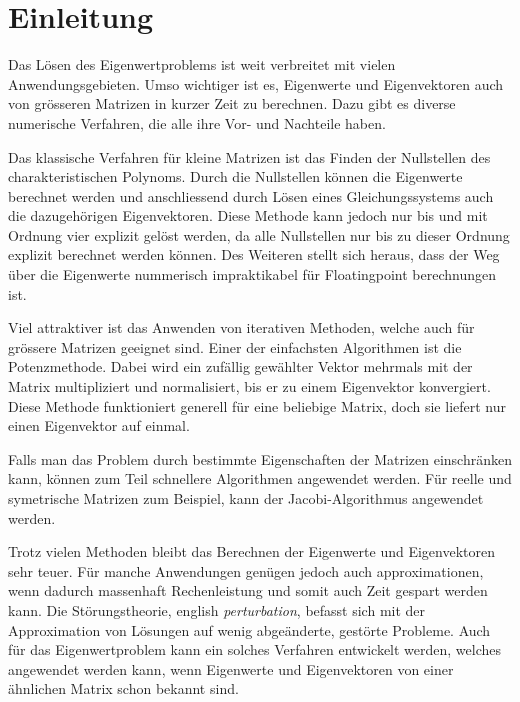 %
%
%
\section{Einleitung\label{ew:section:einleitung}}

Das Lösen des Eigenwertproblems ist  weit verbreitet mit vielen Anwendungsgebieten.
Umso wichtiger ist es, Eigenwerte und Eigenvektoren auch von grösseren Matrizen in kurzer Zeit zu berechnen.
Dazu gibt es diverse numerische Verfahren, die alle ihre Vor- und Nachteile haben.

Das klassische Verfahren für kleine Matrizen ist das Finden der Nullstellen des charakteristischen Polynoms.
Durch die Nullstellen können die Eigenwerte berechnet werden und anschliessend durch Lösen eines Gleichungssystems auch die dazugehörigen Eigenvektoren.
Diese Methode kann jedoch nur bis und mit Ordnung vier explizit gelöst werden, da alle Nullstellen nur bis zu dieser Ordnung explizit berechnet werden können.
Des Weiteren stellt sich heraus, dass der Weg über die Eigenwerte nummerisch impraktikabel für Floatingpoint berechnungen ist. 

Viel attraktiver ist das Anwenden von iterativen Methoden, welche auch für grössere Matrizen geeignet sind.
Einer der einfachsten Algorithmen ist die Potenzmethode.
Dabei wird ein zufällig gewählter Vektor mehrmals mit der Matrix multipliziert und normalisiert, bis er zu einem Eigenvektor konvergiert.
Diese Methode funktioniert generell für eine beliebige Matrix, doch sie liefert nur einen Eigenvektor auf einmal.

Falls man das Problem durch bestimmte Eigenschaften der Matrizen einschränken kann, können zum Teil schnellere Algorithmen angewendet werden.
Für reelle und symetrische Matrizen zum Beispiel, kann der Jacobi-Algorithmus angewendet werden. %

Trotz vielen Methoden bleibt das Berechnen der Eigenwerte und Eigenvektoren sehr teuer.
Für manche Anwendungen genügen jedoch auch approximationen, wenn dadurch massenhaft Rechenleistung und somit auch Zeit gespart werden kann.
Die Störungstheorie, english \textit{perturbation}, befasst sich mit der Approximation von Lösungen auf wenig abgeänderte, gestörte Probleme.
Auch für das Eigenwertproblem kann ein solches Verfahren entwickelt werden, welches angewendet werden kann, wenn Eigenwerte und Eigenvektoren von einer ähnlichen Matrix schon bekannt sind.
